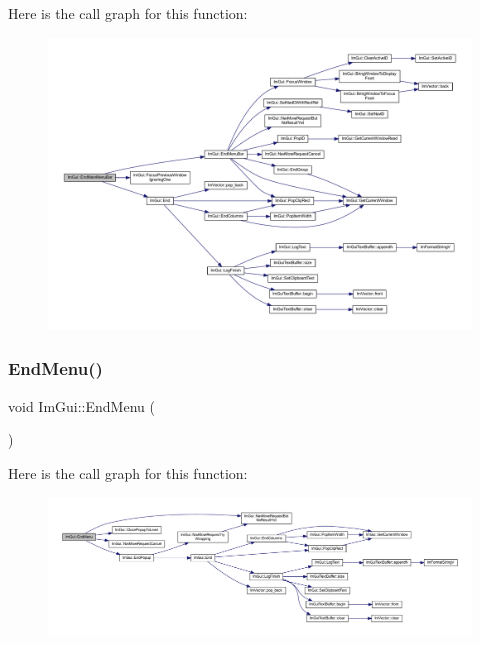 Here is the call graph for this function\+:
\nopagebreak
\begin{figure}[H]
\begin{center}
\leavevmode
\includegraphics[width=350pt]{namespace_im_gui_ab92f330c808546b340eb7bdf7e5f7c95_cgraph}
\end{center}
\end{figure}
\mbox{\label{namespace_im_gui_a1448a5a4e8c431c15f991e9255c0df95}} 
\subsubsection{\texorpdfstring{End\+Menu()}{EndMenu()}}
{\footnotesize\ttfamily void Im\+Gui\+::\+End\+Menu (\begin{DoxyParamCaption}{ }\end{DoxyParamCaption})}

Here is the call graph for this function\+:
\nopagebreak
\begin{figure}[H]
\begin{center}
\leavevmode
\includegraphics[width=350pt]{namespace_im_gui_a1448a5a4e8c431c15f991e9255c0df95_cgraph}
\end{center}
\end{figure}
\mbox{\label{namespace_im_gui_aa226265c140eb6ee375c5b9abc69c4fc}} 
